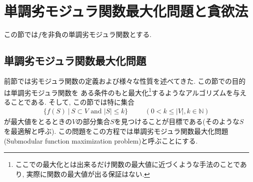 \documentclass[11pt, a4paper, dvipdfmx]{jsarticle}
\theoremstyle{definition}
\newcommand{\N}{\mathbb{N}}
\begin{document}
\section{単調劣モジュラ関数最大化問題と貪欲法}
この節では$f$を非負の単調劣モジュラ関数とする.
\subsection{単調劣モジュラ関数最大化問題}
 前節では劣モジュラ関数の定義および様々な性質を述べてきた. この節での目的は単調劣モジュラ関数を
 ある条件のもと最大化\footnote{ここでの最大化とは出来るだけ関数の最大値に近づくような手法のことであり, 実際に関数の最大値が出る保証はない.}するようなアルゴリズムを与えることである.
 そして, この節では特に集合
 \begin{align*}
    \{ f(S)~|~S\subset V\text{ and }|S| \leq k\}\hspace{30pt} (0< k\leq |V|, k\in\N)
 \end{align*} 
 が最大値をとるときの$V$の部分集合$S$を見つけることが目標である(そのような$S$を最適解と呼ぶ). 
 この問題をこの方程では単調劣モジュラ関数最大化問題(Submodular function maximization problem)と呼ぶことにする. 
\end{document}
